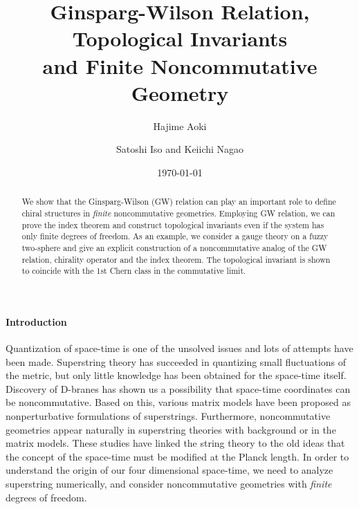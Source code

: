 \documentclass[a4paper,prl,showpacs,twocolumn]{revtex4}
\begin{document}
\title{Ginsparg-Wilson Relation, 
           Topological Invariants \\
       and Finite Noncommutative Geometry }

\author{Hajime Aoki}

\author{Satoshi Iso and Keiichi Nagao}

\date{\today}

\begin{abstract}
We show that the Ginsparg-Wilson (GW) relation can play an important role
to define chiral structures in {\it finite} noncommutative geometries.
Employing GW relation, we can prove the index theorem and construct
topological invariants even if the system has only finite degrees 
of freedom. As an example, we consider
a gauge theory on a fuzzy two-sphere and give an
explicit construction of a noncommutative analog of the
GW relation, chirality operator and the index theorem.
The topological invariant is shown to coincide with the 
1st Chern class in the commutative limit.
\end{abstract}


\maketitle


\setcounter{footnote}{0}
\paragraph{{\bf Introduction}} 
Quantization of space-time is one of
the unsolved issues  and lots of attempts have
been made. Superstring theory has succeeded in quantizing small
fluctuations of the metric,
but only little knowledge has been obtained for the space-time itself.
Discovery of D-branes has shown us a possibility that 
space-time coordinates can be noncommutative\cite{Witten}.
Based on this, various matrix models have been 
proposed as nonperturbative formulations of 
superstrings\cite{BFSS,IKKT,DVV}.
Furthermore, noncommutative geometries appear naturally 
in superstring theories with \coordHE{} 
background\cite{SeibergWitten} or in the matrix 
models\cite{CDS,AIIKKT}.
These studies have linked the string theory to the old
ideas that the concept of the space-time must be modified
at the Planck length\cite{Connes,tam}.
In order to understand the origin of our 
four dimensional space-time\cite{spacetime}, 
we need to analyze 
superstring numerically, and consider 
noncommutative geometries with 
{\it finite} degrees of freedom.
\end{document}
